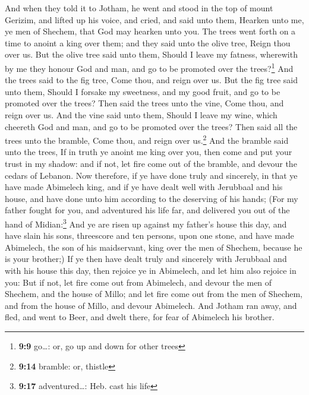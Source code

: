  And when they told it to Jotham, he went and stood in the
top of mount Gerizim, and lifted up his voice, and cried, and said unto
them, Hearken unto me, ye men of Shechem, that God may hearken unto you.
 The trees went forth on a time to anoint a king over
them; and they said unto the olive tree, Reign thou over us.
 But the olive tree said unto them, Should I leave my
fatness, wherewith by me they honour God and man, and go to be promoted
over the trees?\footnote{\textbf{9:9} go\ldots: or, go up and down for
  other trees}  And the trees said to the fig tree, Come
thou, and reign over us.  But the fig tree said unto
them, Should I forsake my sweetness, and my good fruit, and go to be
promoted over the trees?  Then said the trees unto the
vine, Come thou, and reign over us.  And the vine said
unto them, Should I leave my wine, which cheereth God and man, and go to
be promoted over the trees?  Then said all the trees unto
the bramble, Come thou, and reign over us.\footnote{\textbf{9:14}
  bramble: or, thistle}  And the bramble said unto the
trees, If in truth ye anoint me king over you, then come and put your
trust in my shadow: and if not, let fire come out of the bramble, and
devour the cedars of Lebanon.  Now therefore, if ye have
done truly and sincerely, in that ye have made Abimelech king, and if ye
have dealt well with Jerubbaal and his house, and have done unto him
according to the deserving of his hands;  (For my father
fought for you, and adventured his life far, and delivered you out of
the hand of Midian:\footnote{\textbf{9:17} adventured\ldots: Heb. cast
  his life}  And ye are risen up against my father's
house this day, and have slain his sons, threescore and ten persons,
upon one stone, and have made Abimelech, the son of his maidservant,
king over the men of Shechem, because he is your brother;)
 If ye then have dealt truly and sincerely with Jerubbaal
and with his house this day, then rejoice ye in Abimelech, and let him
also rejoice in you:  But if not, let fire come out from
Abimelech, and devour the men of Shechem, and the house of Millo; and
let fire come out from the men of Shechem, and from the house of Millo,
and devour Abimelech.  And Jotham ran away, and fled, and
went to Beer, and dwelt there, for fear of Abimelech his brother.

